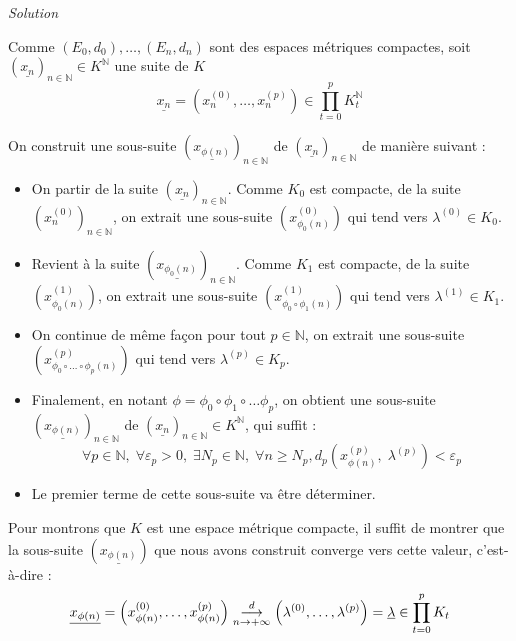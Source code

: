 \documentclass{article}
\begin{document}
\noindent \textit{Solution}

Comme $(E_0, d_0),\ldots,(E_n,d_n)$ sont des espaces métriques compactes, soit $(\underline{x_n})_{n \in \mathbb{N} } \in K^\mathbb{N}$ une suite de $K$
        \[
            \underline{x_n} = \left( x_n^{(0)} , \ldots, x_n^{(p)}\right) \in \prod_{t=0}^p K_t^\mathbb{N} 
        \]

        On construit une sous-suite $( \underline{x_{\phi(n)}})_{n \in \mathbb{N} }$ de $(\underline{x_n})_{n \in \mathbb{N} }$ de manière suivant :
        \begin{itemize}
            \item On partir de la suite $(\underline{x_n})_{n \in \mathbb{N} }$. Comme $K_0$ est compacte, de la suite $\left( x_n^{(0)} \right)_{n \in \mathbb{N}}$,  on extrait une sous-suite $\left( x_{\phi_0(n)}^{(0)} \right)$ qui tend vers $\lambda^{(0)} \in K_0$.
            \item Revient à la suite $\left( \underline{x_{\phi_0(n)}} \right)_{n \in \mathbb{N} }$. Comme $K_1$ est compacte, de la suite $(x_{\phi_0(n)}^{(1)})$, on extrait une sous-suite $\left( x_{\phi_0 \circ\phi_1(n)}^{(1)} \right)$ qui tend vers $\lambda^{(1)} \in K_1$.
            \item On continue de même façon pour tout $p \in \mathbb{N}$, on extrait une sous-suite $\left( x_{\phi_0 \circ \ldots \circ \phi_p(n)}^{(p)} \right)$ qui tend vers $\lambda^{(p)} \in K_p$.
            \item Finalement, en notant $\phi = \phi_0 \circ \phi_1 \circ \ldots \phi_p$, on obtient une sous-suite $\left( \underline{x_{\phi(n)}} \right) _{n \in \mathbb{N} }$ de $(\underline{x_n})_{n \in \mathbb{N} }\in K^\mathbb{N}$, qui suffit :
                \[
                \forall p \in \mathbb{N}, \;\forall \varepsilon_p > 0, \;\exists N_p \in \mathbb{N},\; \forall n \geq N_p, d_p \left( x_{\phi(n)}^{(p)} ,\; \lambda^{(p)} \right) < \varepsilon_p
                \]
            \item Le premier terme de cette sous-suite va être déterminer.
                
        \end{itemize}

        Pour montrons que $K$ est une espace métrique compacte, il suffit de montrer que la sous-suite $\left( \underline{x_{\phi(n)}} \right)$ que nous avons construit converge vers cette valeur, c'est-à-dire : 
                \[
                    \underline{x_{\phi(n)}} = \left( x_{\phi(n)}^{(0)} , \ldots, x_{\phi(n)}^{(p)}\right) \underset{n \rightarrow +\infty} {\buildrel d \over \longrightarrow}\left( \lambda^{(0)} , \ldots, \lambda^{(p)}\right) = \underline{\lambda} \in \prod_{t=0}^p K_t
                \]
\end{document}
